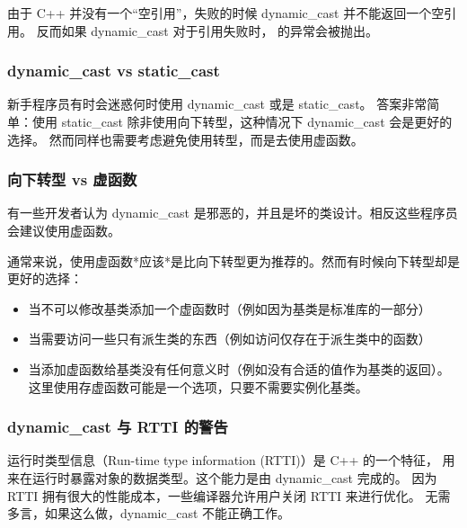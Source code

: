 \documentclass[../../LearnCpp.tex]{subfiles}
\begin{document}
由于 C++ 并没有一个“空引用”，失败的时候 dynamic\_cast 并不能返回一个空引用。
反而如果 dynamic\_cast 对于引用失败时， 的异常会被抛出。

\subsubsection*{dynamic\_cast vs static\_cast}

新手程序员有时会迷惑何时使用 dynamic\_cast 或是 static\_cast。
答案非常简单：使用 static\_cast 除非使用向下转型，这种情况下 dynamic\_cast 会是更好的选择。
然而同样也需要考虑避免使用转型，而是去使用虚函数。

\subsubsection*{向下转型 vs 虚函数}

有一些开发者认为 dynamic\_cast 是邪恶的，并且是坏的类设计。相反这些程序员会建议使用虚函数。

通常来说，使用虚函数*应该*是比向下转型更为推荐的。然而有时候向下转型却是更好的选择：

\begin{itemize}
  \item 当不可以修改基类添加一个虚函数时（例如因为基类是标准库的一部分）
  \item 当需要访问一些只有派生类的东西（例如访问仅存在于派生类中的函数）
  \item 当添加虚函数给基类没有任何意义时（例如没有合适的值作为基类的返回）。
        这里使用存虚函数可能是一个选项，只要不需要实例化基类。
\end{itemize}

\subsubsection*{dynamic\_cast 与 RTTI 的警告}

运行时类型信息（Run-time type information (RTTI)）是 C++ 的一个特征，
用来在运行时暴露对象的数据类型。这个能力是由 dynamic\_cast 完成的。
因为 RTTI 拥有很大的性能成本，一些编译器允许用户关闭 RTTI 来进行优化。
无需多言，如果这么做，dynamic\_cast 不能正确工作。
\end{document}

